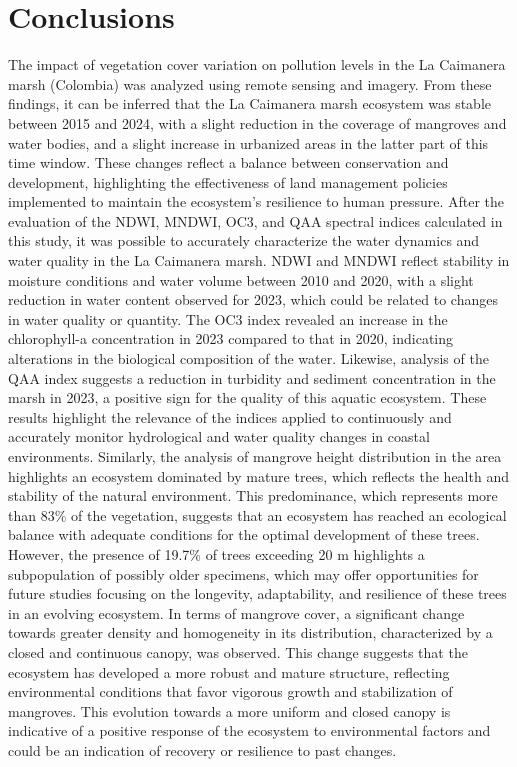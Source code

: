 \documentclass[10pt,a4paper,twocolumn]{article}
\begin{document}
\section*{Conclusions}
The impact of vegetation cover variation on pollution levels in the La Caimanera marsh (Colombia) was analyzed using remote sensing and imagery. From these findings, it can be inferred that the La Caimanera marsh ecosystem was stable between 2015 and 2024, with a slight reduction in the coverage of mangroves and water bodies, and a slight increase in urbanized areas in the latter part of this time window. These changes reflect a balance between conservation and development, highlighting the effectiveness of land management policies implemented to maintain the ecosystem's resilience to human pressure. After the evaluation of the NDWI, MNDWI, OC3, and QAA spectral indices calculated in this study, it was possible to accurately characterize the water dynamics and water quality in the La Caimanera marsh. NDWI and MNDWI reflect stability in moisture conditions and water volume between 2010 and 2020, with a slight reduction in water content observed for 2023, which could be related to changes in water quality or quantity. The OC3 index revealed an increase in the chlorophyll-a concentration in 2023 compared to that in 2020, indicating alterations in the biological composition of the water. Likewise, analysis of the QAA index suggests a reduction in turbidity and sediment concentration in the marsh in 2023, a positive sign for the quality of this aquatic ecosystem. These results highlight the relevance of the indices applied to continuously and accurately monitor hydrological and water quality changes in coastal environments. Similarly, the analysis of mangrove height distribution in the area highlights an ecosystem dominated by mature trees, which reflects the health and stability of the natural environment. This predominance, which represents more than 83\% of the vegetation, suggests that an ecosystem has reached an ecological balance with adequate conditions for the optimal development of these trees. However, the presence of 19.7\% of trees exceeding 20 m highlights a subpopulation of possibly older specimens, which may offer opportunities for future studies focusing on the longevity, adaptability, and resilience of these trees in an evolving ecosystem. In terms of mangrove cover, a significant change towards greater density and homogeneity in its distribution, characterized by a closed and continuous canopy, was observed. This change suggests that the ecosystem has developed a more robust and mature structure, reflecting environmental conditions that favor vigorous growth and stabilization of mangroves. This evolution towards a more uniform and closed canopy is indicative of a positive response of the ecosystem to environmental factors and could be an indication of recovery or resilience to past changes.
\end{document}
